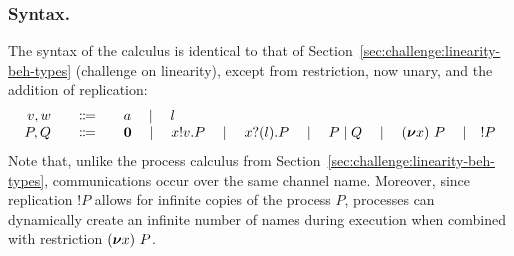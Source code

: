 \documentclass[runningheads]{llncs}
\begin{document}
\subsubsection{Syntax.}
The syntax of the calculus is identical to that of
Section~\ref{sec:challenge:linearity-beh-types} (challenge on
linearity), except from restriction, now unary, and the addition of
replication:
\begin{displaymath}
  \begin{array}{r@{\qquad}c@{\qquad}l}
    v,w & \Coloneqq & a \quad\mid\quad l \\
    P,Q & \Coloneqq & \Pend
               \quad \mid\quad \Pout{x}{v}{P}
               \quad \mid\quad \Pin{x}{l}{P}
               \quad \mid\quad \Ppar{P}{Q}
               \quad \mid\quad \Pres{x}{}{P}
               \quad \mid\quad !P
  \end{array}
\end{displaymath}
Note that, unlike the process calculus from
Section~\ref{sec:challenge:linearity-beh-types}, communications occur
over the same channel name. Moreover, since replication $!P$ allows
for infinite copies of the process $P$, processes can dynamically
create an infinite number of names during execution when combined with
restriction $(\bm{\nu} x)~{P}$.
%
\end{document}
